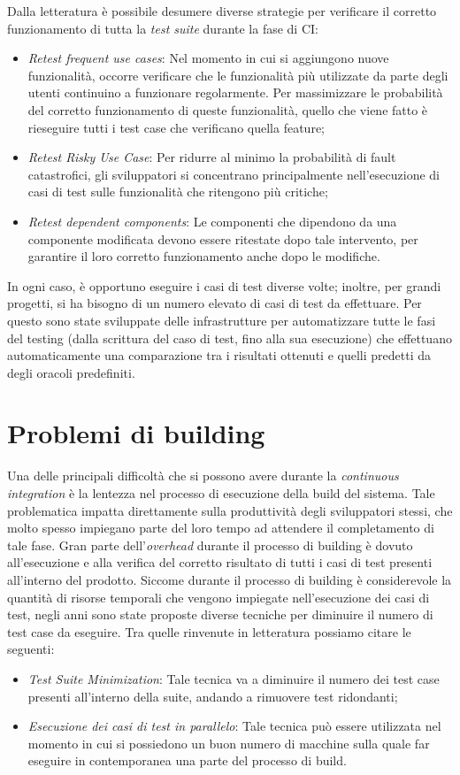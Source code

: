 Dalla letteratura è possibile desumere diverse strategie per verificare il
corretto funzionamento di tutta la \emph{test suite} durante la fase di CI:
\begin{itemize}
	\item \emph{Retest frequent use cases}: Nel momento in cui si aggiungono nuove funzionalità, occorre verificare che le funzionalità più utilizzate da parte
	degli utenti continuino a funzionare regolarmente. Per massimizzare le probabilità del corretto funzionamento di queste funzionalità, quello che viene fatto è rieseguire tutti i test case che verificano quella feature;
	\item\emph{ Retest Risky Use Case}: Per ridurre al minimo la probabilità di fault catastrofici, gli sviluppatori si concentrano principalmente nell’esecuzione di casi di test sulle funzionalità che ritengono più critiche;
	\item \emph{Retest dependent components}: Le componenti che dipendono da una componente modificata devono essere ritestate dopo tale intervento, per garantire il loro corretto funzionamento anche dopo le modifiche.
\end{itemize}

In ogni caso, è opportuno eseguire i casi di test diverse volte; inoltre, per grandi progetti, si ha bisogno di un numero elevato di casi di test da effettuare. Per
questo sono state sviluppate delle infrastrutture per automatizzare tutte le fasi del testing (dalla scrittura del caso di test, fino alla sua esecuzione) che effettuano
automaticamente una comparazione tra i risultati ottenuti e quelli predetti da degli oracoli predefiniti.
\section{Problemi di building}
Una delle principali difficoltà che si possono avere durante la \emph{continuous integration} è la lentezza nel processo di esecuzione della build del sistema. Tale problematica impatta direttamente sulla produttività degli sviluppatori stessi, che molto spesso impiegano parte del loro tempo ad attendere il completamento di tale fase. Gran parte dell'\emph{overhead} durante il processo di building è dovuto
all’esecuzione e alla verifica del corretto risultato di tutti i casi di test presenti all’interno del prodotto. Siccome durante il processo di building è considerevole la
quantità di risorse temporali che vengono impiegate nell’esecuzione dei casi di test, negli anni sono state proposte diverse tecniche per diminuire il numero di test case
da eseguire. Tra quelle rinvenute in letteratura possiamo citare le seguenti:
\begin{itemize}
	\item \emph{Test Suite Minimization}: Tale tecnica va a diminuire il numero dei test case presenti all’interno della suite, andando a rimuovere test ridondanti;
	\item \emph{Esecuzione dei casi di test in parallelo}: Tale tecnica può essere utilizzata nel momento in cui si possiedono un buon numero di macchine sulla quale far eseguire in contemporanea una parte del processo di build.
\end{itemize}

